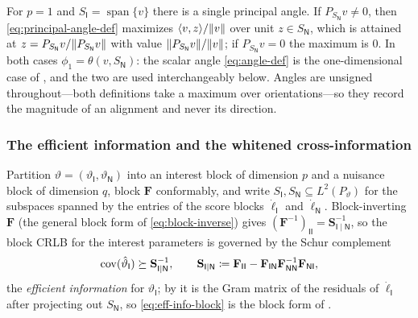 \documentclass{IEEEtran}
\begin{document}
\begin{remark}\label{rem:angle-consistency}
  For $p = 1$ and $S_{\mathsf{I}} = \operatorname{span}\{v\}$ there is a single principal angle. If $P_{S_{\mathsf{N}}}v \neq 0$, then \eqref{eq:principal-angle-def} maximizes $\langle v, z\rangle/\lVert v\rVert$ over unit $z \in S_{\mathsf{N}}$, which is attained at $z = P_{S_{\mathsf{N}}}v/\lVert P_{S_{\mathsf{N}}}v\rVert$ with value $\lVert P_{S_{\mathsf{N}}}v\rVert/\lVert v\rVert$; if $P_{S_{\mathsf{N}}}v = 0$ the maximum is $0$. In both cases $\phi_{1} = \theta(v, S_{\mathsf{N}})$: the scalar angle \eqref{eq:angle-def} is the one-dimensional case of , and the two are used interchangeably below. Angles are unsigned throughout---both definitions take a maximum over orientations---so they record the magnitude of an alignment and never its direction.
\end{remark}

\subsubsection{The efficient information and the whitened cross-information}

Partition $\vartheta = (\vartheta_{\mathsf{I}}, \vartheta_{\mathsf{N}})$ into an interest block of dimension $p$ and a nuisance block of dimension $q$, block $\mathbf{F}$ conformably, and write $S_{\mathsf{I}}, S_{\mathsf{N}} \subseteq L^{2}(P_{\vartheta})$ for the subspaces spanned by the entries of the score blocks $\dot{\ell}_{\mathsf{I}}$ and $\dot{\ell}_{\mathsf{N}}$. Block-inverting $\mathbf{F}$ (the general block form of \eqref{eq:block-inverse}) gives $(\mathbf{F}^{-1})_{\mathsf{II}} = \mathbf{S}_{\mathsf{I}\mid\mathsf{N}}^{-1}$, so the block CRLB for the interest parameters is governed by the Schur complement
\begin{equation}
  \operatorname{cov}(\hat{\vartheta}_{\mathsf{I}}) \succeq \mathbf{S}_{\mathsf{I}\mid\mathsf{N}}^{-1},
  \qquad
  \mathbf{S}_{\mathsf{I}\mid\mathsf{N}}
  \coloneq \mathbf{F}_{\mathsf{II}} - \mathbf{F}_{\mathsf{IN}}\mathbf{F}_{\mathsf{NN}}^{-1}\mathbf{F}_{\mathsf{NI}},
  \label{eq:eff-info-block}
\end{equation}
the \emph{efficient information} for $\vartheta_{\mathsf{I}}$; by
 it is the Gram matrix of the
residuals of $\dot{\ell}_{\mathsf{I}}$ after projecting out $S_{\mathsf{N}}$, so \eqref{eq:eff-info-block} is the block form of .
\end{document}
